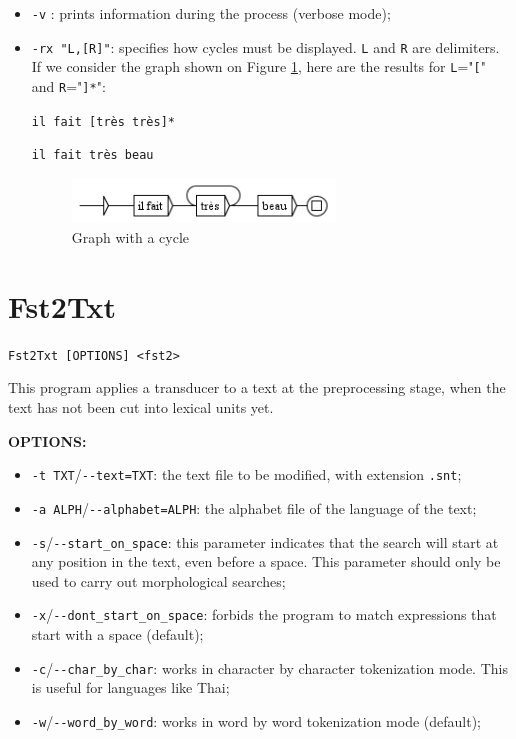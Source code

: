 \begin{itemize}
  \item \verb$-v$ : prints information during the process (verbose mode);
  
  \item \verb$-rx "L,[R]"$: specifies how cycles must be displayed. \verb$L$ and
  \verb$R$ are delimiters. If we consider the graph shown on Figure \ref{cycle},
  here are the results for \verb$L$="\verb$[$" and \verb$R$="\verb$]*$":

  \medskip
  \noindent
  \texttt{il fait [tr\`es tr\`es]*}
  
  \noindent
  \texttt{il fait tr\`es beau}

\begin{figure}[h]
\begin{center}
\includegraphics[width=7cm]{resources/img/fig10-1.png}
\caption{Graph with a cycle\label{cycle}}
\end{center}
\end{figure}

\end{itemize}







\section{Fst2Txt}
\verb+Fst2Txt [OPTIONS] <fst2>+

\bigskip
\noindent This program applies a transducer to a text at the
preprocessing stage, when the text has not been cut into lexical units yet.

\bigskip
\noindent \textbf{OPTIONS:}
\begin{itemize}
  \item \verb+-t TXT+/\verb+--text=TXT+: the text file to be
  modified, with extension \verb+.snt+;
  
  \item \verb+-a ALPH+/\verb+--alphabet=ALPH+: the alphabet file of the language of the
  text;

  \item \verb+-s+/\verb+--start_on_space+: this parameter indicates that the
  search will start at any position in the text, even before a space. This 
  parameter should only be used to carry out morphological searches;
  
  \item \verb+-x+/\verb+--dont_start_on_space+: forbids the program to match
  expressions that start with a space (default);
  
  \item \verb+-c+/\verb+--char_by_char+: works in character by character
  tokenization mode. This is useful for languages like Thai;
  
  \item \verb+-w+/\verb+--word_by_word+: works in word by word
  tokenization mode (default);
\end{itemize}

